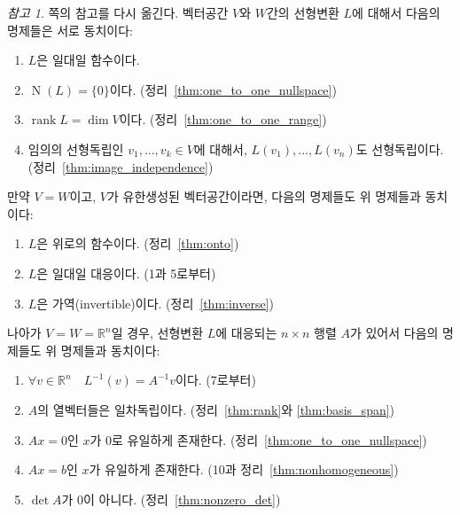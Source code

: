 \documentclass[unfonts,oneside,a4paper]{oblivoir}
\makeatletter
\theoremstyle{definition}
\theoremstyle{theorem}
\theoremstyle{theorem}
\theoremstyle{remark}
\newtheorem*{remark}{참고}
\theoremstyle{remark}
\theoremstyle{remark}
\theoremstyle{remark}
\renewcommand{\vec}[1]{\bm{\mathit{#1}}}
\newcommand{\vecz}{\bm{\mathrm{0}}}
\DeclareMathOperator{\Null}{N}
\DeclareMathOperator{\rank}{rank}
\newcommand\nextitem[1]{%
    \setcounter{\@enumctr}{#1}%
    \addtocounter{\@enumctr}{-1}%
}
\makeatother
\begin{document}
\begin{remark} \label{page:equiv_remark_update}
    \pageref{page:equiv_remark}쪽의 참고를 다시 옮긴다.
    벡터공간 $V$와 $W$간의 선형변환 $L$에 대해서 다음의 명제들은 서로 동치이다:
    \begin{enumerate}
        \item $L$은 일대일 함수이다.
        \item $\Null(L) = \{\vecz\}$이다. (정리~\ref{thm:one_to_one_nullspace})
        \item $\rank L = \dim V$이다. (정리~\ref{thm:one_to_one_range})
        \item 임의의 선형독립인 $\vec v_1, \dots, \vec v_k \in V$에 대해서, $L(\vec v_1), \dots, L(\vec v_n)$도 선형독립이다. (정리~\ref{thm:image_independence})
    \end{enumerate}

    만약 $V = W$이고, $V$가 유한생성된 벡터공간이라면, 다음의 명제들도 위 명제들과 동치이다:
    \begin{enumerate}
        \nextitem{5}
        \item $L$은 위로의 함수이다. (정리~\ref{thm:onto})
        \item $L$은 일대일 대응이다. (1과 5로부터)
        \item $L$은 가역(invertible)이다. (정리~\ref{thm:inverse})
    \end{enumerate}

    나아가 $V = W = \mathbb R^n$일 경우, 선형변환 $L$에 대응되는 $n \times n$ 행렬 $A$가 있어서 다음의 명제들도 위 명제들과 동치이다:
    \begin{enumerate}
        \nextitem{8}
        \item $\forall \vec v \in \mathbb R^n \quad L^{-1}(\vec v) = A^{-1} \vec v$이다. (7로부터)
        \item $A$의 열벡터들은 일차독립이다. (정리~\ref{thm:rank}와 \ref{thm:basis_span})
        \item $A \vec x = \vecz$인 $\vec x$가 $\vecz$로 유일하게 존재한다. (정리~\ref{thm:one_to_one_nullspace})
        \item $A \vec x = \vec b$인 $\vec x$가 유일하게 존재한다. (10과 정리~\ref{thm:nonhomogeneous})
        \item $\det A$가 0이 아니다. (정리~\ref{thm:nonzero_det})
    \end{enumerate}
\end{remark}
\end{document}
